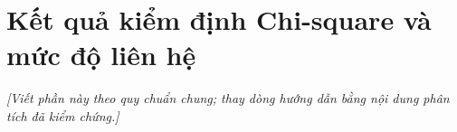 \section{Kết quả kiểm định Chi-square và mức độ liên hệ}
\noindent\textit{[Viết phần này theo quy chuẩn chung; thay dòng hướng dẫn bằng nội dung phân tích đã kiểm chứng.]}

